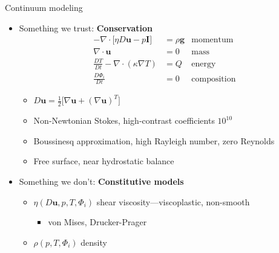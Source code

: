 \documentclass{beamer}
\begin{document}
\begin{frame}{Continuum modeling}
  \begin{itemize}
  \item Something we trust: \textbf{Conservation}
    \begin{align*}
      -\nabla\cdot \big[ \eta D \bm u - p \bm I \big] &= \rho \bm g & \text{momentum} \\
      \nabla \cdot \bm u &= 0 & \text{mass} \\
      \frac{D T}{D t} - \nabla\cdot (\kappa \nabla T) &= Q & \text{energy} \\
      \frac{D \Phi_i}{D t} &= 0 & \text{composition}
    \end{align*}
    \begin{itemize}
    \item $D \bm u = \frac 1 2 \big[ \nabla \bm u + (\nabla \bm u)^T \big]$
    \item Non-Newtonian Stokes, high-contrast coefficients $10^{10}$
    \item Boussinesq approximation, high Rayleigh number, zero Reynolds
    \item Free surface, near hydrostatic balance
    \end{itemize}
  \item Something we don't: \textbf{Constitutive models}
    \begin{itemize}
    \item $\eta(D\bm u,p,T,\Phi_i)$ shear viscosity---viscoplastic, non-smooth
      \begin{itemize}
      \item von Mises, Drucker-Prager
      \end{itemize}
    \item $\rho(p,T,\Phi_i)$ density
    \end{itemize}
  \end{itemize}
\end{frame}
\end{document}
